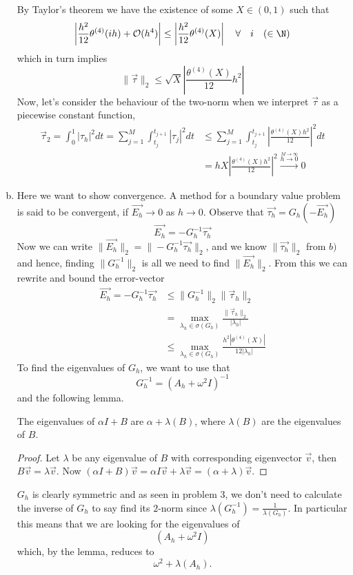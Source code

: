 \begin{enumerate}[a)]
By Taylor's theorem we have the existence of some $X \in (0,1)$ such that
  $$ \left| \frac{h^2}{12} \theta^{(4)}(ih) + \mathcal{O}(h^4)\right| \leq \left|\frac{h^2}{12}\theta^{(4)}(X)\right| \quad \forall \quad i \quad (\in \N) $$
which in turn implies
  $$ \|\vec{\tau}\|_2 \leq \sqrt{X}\left|\frac{\theta^{(4)}(X)}{12}h^2 \right| $$
Now, let's consider the behaviour of the two-norm when we interpret $\vec{\tau}$ as a piecewise constant function,
\begin{align} \vec{\tau}_2 = \int_{0}^{1}|\tau_h|^2 dt = \sum_{j=1}^{M}\int_{t_j}^{t_{j+1}}|\tau_j|^2 dt & \leq \sum_{j=1}^{M}\int_{t_j}^{t_{j+1}}\left|\frac{\theta^{(4)}(X)h^2}{12}\right|^2 dt \\
  & = hX \left|\frac{\theta^{(4)}(X)h^2}{12}\right|^2 \xrightarrow{\stackrel{M\to \infty}{h \to 0}}0
\end{align}

  \item Here we want to show convergence. A method for a boundary value problem is said to be convergent, if $\vec{E_h}\to 0 $ as $h\to 0$. Observe that $\vec{\tau_h}=G_h(-\vec{E_h})$
     \begin{equation}
       \vec{E_h} = -G_h^{-1}\vec{\tau_h}
     \end{equation}
Now we can write $\|\vec{E_h}\|_2 = \|-G_h^{-1}\vec{\tau_h}\|_2$, and we know $\|\vec{\tau_h}\|_2$ from $b)$ and hence, finding $\|G_h^{-1}\|_2$ is all we need to find $\|\vec{E_h}\|_2$.
From this we can rewrite and bound the error-vector
\begin{equation}\label{Ebound}
  \begin{aligned}
    \vec{E_h} = -G_h^{-1}\vec{\tau_h} & \leq \|G_h^{-1}\|_2\|\vec{\tau}_h\|_2 \\
      & = \max_{\lambda_h\in\sigma(G_h)}\frac{\|\vec{\tau}_h\|_2}{|\lambda_h|} \\
      & \leq \max_{\lambda_h\in\sigma(G_h)}\frac{h^2|\theta^{(4)}(X)|}{12|\lambda_h|}
  \end{aligned}
\end{equation}
To find the eigenvalues of $G_h$, we want to use that
  $$ G_h^{-1} = \left(A_h + \omega^2I\right)^{-1} $$
  and the following lemma.
\begin{lemma}
  The eigenvalues of \(\alpha I+B\) are \(\alpha+\lambda(B)\), where $\lambda(B)$ are the eigenvalues of $B$.
\end{lemma}
\begin{proof}
  Let $\lambda$ be any eigenvalue of $B$ with corresponding eigenvector $\vec{v}$, then $B\vec{v}=\lambda\vec{v}$. Now $(\alpha I + B)\vec{v}=\alpha I\vec{v}+\lambda\vec{v}=(\alpha+\lambda)\vec{v}$.
\end{proof}
  $G_h$ is clearly symmetric and as seen in problem $3$, we don't need to calculate the inverse of $G_h$ to say find its $2$-norm since $\lambda(G_h^{-1})=\frac{1}{\lambda(G_h)}$. In particular this means that we are looking for the eigenvalues of
    $$ (A_h + \omega^2I) $$
  which, by the lemma, reduces to
    $$\omega^2+\lambda(A_h).$$



\end{enumerate}
